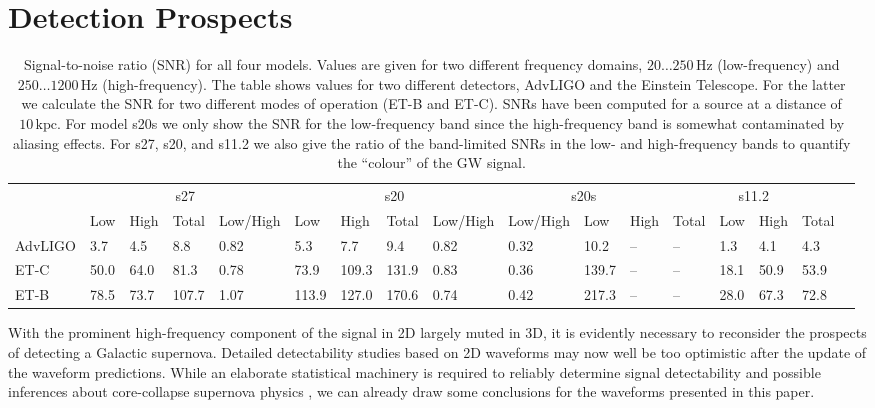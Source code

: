 \section{Detection Prospects} \label{sec:obs}
\begin{table}
\centering
\caption{Signal-to-noise ratio (SNR) for all four models. Values
are given for two different frequency domains, $20\ldots 250 \, \mathrm{Hz}$
(low-frequency) and $250\ldots 1200 \, \mathrm{Hz}$
(high-frequency). The table shows values for two different
detectors, AdvLIGO and the Einstein Telescope. For the latter
we calculate the SNR for two
different modes of operation (ET-B and ET-C).  SNRs have been
computed for a source at a distance of $10 \, \mathrm{kpc}$. 
For model s20s we only show the
SNR for the low-frequency band since the high-frequency band 
is somewhat contaminated
by aliasing effects. For s27, s20, and s11.2 we also give the ratio of the band-limited SNRs in the low- and high-frequency bands to quantify
the ``colour'' of the GW signal.
\label{table:SNR}
}
\begin{tabular}{l|l|l|l|l|l|l|l|l|l|l|l|l|l|l|l|l|}
\cline{2-16}
\multirow{2}{*}{}             & \multicolumn{4}{c|}{s27}               & \multicolumn{4}{c|}{s20}                                  & \multicolumn{3}{c|}{s20s}  & \multicolumn{4}{c|}{s11.2}  \\ \cline{2-16} 
                              & Low      & High    & Total  & Low/High &      Low      & High     & Total  & Low/High   & Low/High & Low      & High    & Total & Low      & High    & Total       \\ \hline
\multicolumn{1}{|l|}{AdvLIGO} & 3.7      & 4.5     & 8.8    &  0.82    & 5.3           & 7.7      & 9.4   &   0.82     &    0.32   & 10.2     & --      & --    & 1.3      & 4.1     & 4.3      \\ \hline
\multicolumn{1}{|l|}{ET-C}    & 50.0     & 64.0    & 81.3   &  0.78    & 73.9          & 109.3    & 131.9 &   0.83     &    0.36   & 139.7    & --      & --    & 18.1     & 50.9    & 53.9     \\ \hline
\multicolumn{1}{|l|}{ET-B}    & 78.5     & 73.7    & 107.7  &  1.07    & 113.9          & 127.0    & 170.6  &   0.74   &    0.42   & 217.3    & --      & --    & 28.0     & 67.3    & 72.8      \\ \hline
\end{tabular}
\end{table}

With the prominent high-frequency component of the signal in 2D
largely muted in 3D, it is evidently necessary to reconsider the
prospects of detecting a Galactic supernova. Detailed detectability
studies based on 2D waveforms \citep{logue_12} may now well be too
optimistic after the update of the waveform predictions.  While an
elaborate statistical machinery is required to reliably determine
signal detectability and possible inferences about core-collapse
supernova physics \citep{logue_12,hayama_15}, we can
already draw some conclusions for the waveforms presented
in this paper.

